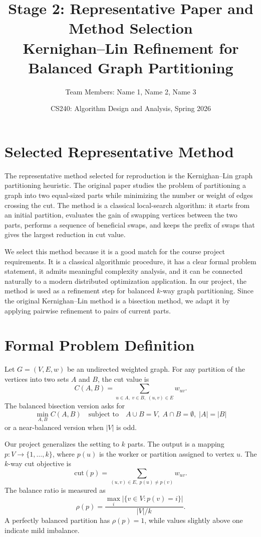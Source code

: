 \documentclass[11pt]{article}
\title{\textbf{Stage 2: Representative Paper and Method Selection}\\
Kernighan--Lin Refinement for Balanced Graph Partitioning}
\author{Team Members: Name 1, Name 2, Name 3}
\date{CS240: Algorithm Design and Analysis, Spring 2026}
\begin{document}
\maketitle

\section{Selected Representative Method}

The representative method selected for reproduction is the Kernighan--Lin graph
partitioning heuristic. The original paper studies the problem of partitioning
a graph into two equal-sized parts while minimizing the number or weight of
edges crossing the cut. The method is a classical local-search algorithm: it
starts from an initial partition, evaluates the gain of swapping vertices
between the two parts, performs a sequence of beneficial swaps, and keeps the
prefix of swaps that gives the largest reduction in cut value.

We select this method because it is a good match for the course project
requirements. It is a classical algorithmic procedure, it has a clear formal
problem statement, it admits meaningful complexity analysis, and it can be
connected naturally to a modern distributed optimization application. In our
project, the method is used as a refinement step for balanced $k$-way graph
partitioning. Since the original Kernighan--Lin method is a bisection method,
we adapt it by applying pairwise refinement to pairs of current parts.

\section{Formal Problem Definition}

Let $G=(V,E,w)$ be an undirected weighted graph. For any partition of the
vertices into two sets $A$ and $B$, the cut value is
\[
    C(A,B) = \sum_{u\in A,\;v\in B,\;(u,v)\in E} w_{uv}.
\]
The balanced bisection version asks for
\[
    \min_{A,B} C(A,B)
    \quad
    \text{subject to}
    \quad
    A\cup B=V,\; A\cap B=\emptyset,\; |A|=|B|
\]
or a near-balanced version when $|V|$ is odd.

Our project generalizes the setting to $k$ parts. The output is a mapping
$p:V\to\{1,\ldots,k\}$, where $p(u)$ is the worker or partition assigned to
vertex $u$. The $k$-way cut objective is
\[
    \mathrm{cut}(p)
    =
    \sum_{(u,v)\in E,\; p(u)\neq p(v)} w_{uv}.
\]
The balance ratio is measured as
\[
    \rho(p)
    =
    \frac{\max_i |\{v\in V:p(v)=i\}|}{|V|/k}.
\]
A perfectly balanced partition has $\rho(p)=1$, while values slightly above
one indicate mild imbalance.
\end{document}
